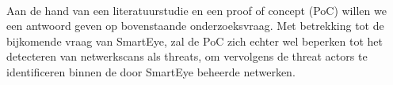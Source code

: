 \paragraph{}
Aan de hand van een literatuurstudie en een proof of concept (PoC) willen we een antwoord geven op bovenstaande onderzoeksvraag. Met betrekking tot de bijkomende vraag van SmartEye, zal de PoC zich echter wel beperken tot het detecteren van netwerkscans als threats, om vervolgens de threat actors te identificeren binnen de door SmartEye beheerde netwerken.




